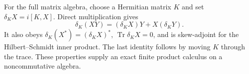 For the full matrix algebra, choose a Hermitian matrix $K$ and set
$\delta_KX=i[K,X]$. Direct multiplication gives
\begin{equation}
 \delta_K(XY)=(\delta_KX)Y+X(\delta_KY).
 \label{c:core:inner-derivation}
\end{equation}
It also obeys $\delta_K(X^*)=(\delta_KX)^*$,
$\operatorname{Tr}\delta_KX=0$, and is skew-adjoint for the
Hilbert--Schmidt inner product. The last identity follows by moving
$K$ through the trace. These properties supply an exact finite
product calculus on a noncommutative algebra.


